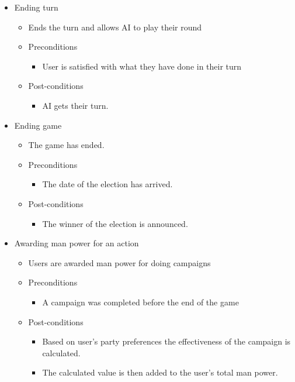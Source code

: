 \documentclass{article}
\begin{document}
	\begin{itemize}
   		\item  Ending turn
			\begin{itemize}
				\item Ends the turn and allows AI to play their round
				\item Preconditions
				\begin{itemize}
					\item User is satisfied with what they have done in their turn
				\end{itemize}
				\item Post-conditions
				\begin{itemize}
					\item AI gets their turn.
				\end{itemize}
			\end{itemize}
	\end{itemize}
	
	\begin{itemize}
   		\item  Ending game
			\begin{itemize}
				\item The game has ended.
				\item Preconditions
				\begin{itemize}
					\item The date of the election has arrived.
				\end{itemize}
				\item Post-conditions
				\begin{itemize}
					\item The winner of the election is announced.
				\end{itemize}
			\end{itemize}
	\end{itemize}	
	\begin{itemize}
		\item Awarding man power for an action
			\begin{itemize}
				\item Users are awarded man power for doing campaigns 
				\item Preconditions
				\begin{itemize}	
					\item A campaign was completed before the end of the game
				\end{itemize}
				\item Post-conditions
				\begin{itemize}	
					\item Based on user's party preferences the effectiveness of the campaign is calculated.
					\item The calculated value is then added to the user's total man power.
				\end{itemize}
			\end{itemize}
	\end{itemize}
	
\end{document}
